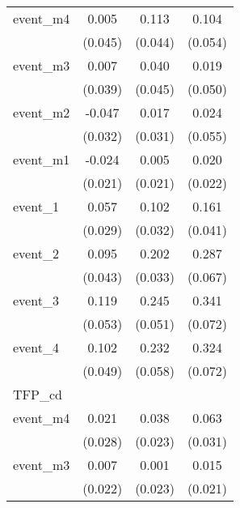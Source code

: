 {\begin{tabular}{l*{3}{c}}
event\_m4    &       0.005         &       0.113\sym{*}  &       0.104         \\
            &     (0.045)         &     (0.044)         &     (0.054)         \\
[1em]
event\_m3    &       0.007         &       0.040         &       0.019         \\
            &     (0.039)         &     (0.045)         &     (0.050)         \\
[1em]
event\_m2    &      -0.047         &       0.017         &       0.024         \\
            &     (0.032)         &     (0.031)         &     (0.055)         \\
[1em]
event\_m1    &      -0.024         &       0.005         &       0.020         \\
            &     (0.021)         &     (0.021)         &     (0.022)         \\
[1em]
event\_1     &       0.057\sym{*}  &       0.102\sym{**} &       0.161\sym{***}\\
            &     (0.029)         &     (0.032)         &     (0.041)         \\
[1em]
event\_2     &       0.095\sym{*}  &       0.202\sym{***}&       0.287\sym{***}\\
            &     (0.043)         &     (0.033)         &     (0.067)         \\
[1em]
event\_3     &       0.119\sym{*}  &       0.245\sym{***}&       0.341\sym{***}\\
            &     (0.053)         &     (0.051)         &     (0.072)         \\
[1em]
event\_4     &       0.102\sym{*}  &       0.232\sym{***}&       0.324\sym{***}\\
            &     (0.049)         &     (0.058)         &     (0.072)         \\
\hline
TFP\_cd      &                     &                     &                     \\
event\_m4    &       0.021         &       0.038         &       0.063\sym{*}  \\
            &     (0.028)         &     (0.023)         &     (0.031)         \\
[1em]
event\_m3    &       0.007         &       0.001         &       0.015         \\
            &     (0.022)         &     (0.023)         &     (0.021)         \\

\end{tabular}}
